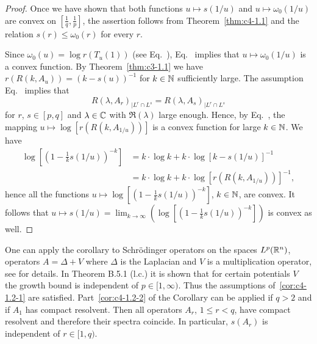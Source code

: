 \begin{proof}
Once we have shown that both functions $u \mapsto s(1/u)$ and $u \mapsto \omega_{0}(1/u)$ are convex on $[\frac{1}{q},\frac{1}{p}]$, the assertion follows from  Theorem~\ref{thm:c4-1.1} and the relation $s(r) \leq \omega_{0}(r)$ for every $r$.

Since $\omega_{0}(u) = \log r(T_{u}(1))$ (see Eq.~), Eq.~ implies that $u \mapsto \omega_0(1/u)$ is a convex function.
By Theorem~\ref{thm:c3-1.1} we have $r(R(k,A_{u})) = (k-s(u))^{-1}$ for $k \in \mathbb{N}$ sufficiently large.
The assumption Eq.~ implies that 
\[
R(\lambda,A_{r})_{|L^{r} \cap L^{s}} = R(\lambda,A_{s})_{|L^{r} \cap L^{s}}
\]
for $r$, $s \in [p,q]$ and $\lambda \in \mathbb{C}$ with $\Re(\lambda)$ large enough.
Hence, by Eq.~, the mapping  $u \mapsto \log [r(R(k,A_{1/u}))]$ is a convex function for large $k \in \mathbb{N}$.
We have
\begin{align*}
\log  \left[(1 - \frac{1}{k}s(1/u))^{-k}\right] &= k \cdot \log k + k \cdot \log [k - s(1/u)]^{-1} \\
&= k \cdot \log k + k \cdot \log [r(R(k,A_{1/u}))]^{-1},
\end{align*}
hence all the functions $u \mapsto \log[(1 - \frac{1}{k}s(1/u))^{-k}]$, $k \in \mathbb{N}$, are convex.
It follows that $u \mapsto s(1/u) = \lim_{k\to\infty}(\log [(1 - \frac{1}{k}s(1/u))^{-k}])$ is convex as well.
\end{proof}
One can apply the corollary to Schrödinger operators on the spaces $L^{p}(\mathbb{R}^{n})$, \ie operators $A = \Delta + V$ where $\Delta$ is the Laplacian and $V$ is a multiplication operator, see  \textcite{simon:1982} for details.
In Theorem B.5.1 (l.c.) it is shown that for certain potentials $V$ the growth bound is independent of\/ $p \in [1,\infty)$.
Thus the assumptions of~\ref{cor:c4-1.2-1} are satisfied.
Part~\ref{cor:c4-1.2-2} of the Corollary can be applied if\/ $q > 2$ and if\/ $A_{1}$ has compact resolvent.
Then all operators $A_{r}$, $1 \leq r < q$, have compact resolvent and therefore their spectra coincide.
In particular, $s(A_{r})$ is independent of\/ $r \in [1,q)$.

